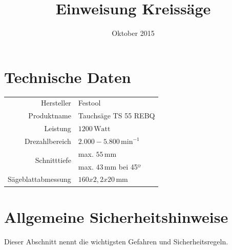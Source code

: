 \documentclass{\basedir/fablab-document}
\date{Oktober 2015}
\author{}
\title{Einweisung Kreissäge}
\begin{document}
\dosecttoc
\faketableofcontents
{}


\section{Technische Daten}
\begin{tabular}{r|l}
Hersteller & Festool \\
Produktname & Tauchsäge TS 55 REBQ \\
Leistung & $1200\,\mathrm{Watt}$ \\
Drezahlbereich & $2.000 - 5.800\,\mathrm{min}^{-1}$ \\
\multirow{2}{*}{Schnitttiefe} & max. $55\,\mathrm{mm}$ \\
             & max. $43\,\mathrm{mm}$ bei 45º\\
Sägeblattabmessung & $160x2,2x20\,\mathrm{mm}$\\
\end{tabular}

\section[Allgemeine Sicherheitshinweise]{Allgemeine Sicherheitshinweise}

Dieser Abschnitt nennt die wichtigsten Gefahren und Sicherheitsregeln.
\end{document}
